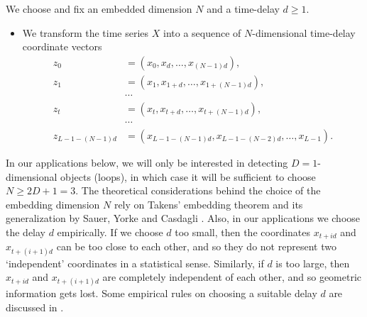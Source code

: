 \documentclass[11pt]{amsart}
\theoremstyle{definition}
\theoremstyle{remark}
\numberwithin{equation}{section}
\begin{document}
We choose and fix an embedded dimension $N$ and a time-delay $d\geq 1$.
\begin{itemize}
\item We transform the time series $X$ into a sequence of $N$-dimensional time-delay coordinate vectors \begin{equation}\begin{split}\label{eqn:z}
    z_0&=(x_0,x_{d},\ldots,x_{(N-1) d}),\\ z_1&=(x_1,x_{1+d},\ldots,x_{1+(N-1)d}),\\  &\cdots \\z_{t}&= (x_{t},x_{t+d},\ldots,x_{t+(N-1)d}),\\ &\cdots \\
    z_{L-1-(N-1)d}&=(x_{L-1-(N-1)d},x_{L-1-(N-2)d},\ldots,x_{L-1}).\end{split}\end{equation}
\end{itemize}
 In our applications below, we will only be interested in detecting
 $D=1$-dimensional objects (loops), in which case it will be sufficient to choose $N\geq 2D+1=3$.
The theoretical considerations behind the choice of the  embedding dimension $N$  rely on Takens' embedding theorem \cite{takens1981detecting}  and its generalization by Sauer, Yorke and Casdagli \cite{tim1991embedology}.
Also, in our applications we choose the delay $d$ empirically. If we choose $d$ too small, then the
coordinates $x_{t+id}$  and $x_{t+(i+1)d}$ can be too
close to each other, and so they do not represent two `independent'
coordinates in a statistical sense. Similarly, if $d$ is too large, then $x_{t+id}$  and $x_{t+(i+1)d}$ are completely independent of each
other, and so geometric information gets lost.
Some empirical rules on choosing a suitable  delay $d$ are discussed in \cite{abarbanel1993analysis}.
\end{document}
